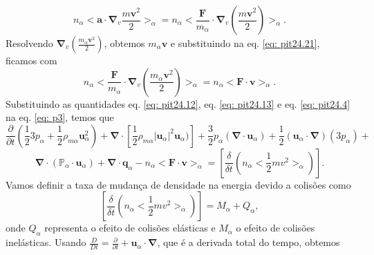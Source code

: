 \documentclass[12pt,oneside,a4paper]{abntex2}
\begin{document}
\begin{equation}
\label{eq: pit24.21}
n_\alpha <\bm{a} \cdot \bm{\nabla}_v \frac{m \bm{v}^2}{2}>_\alpha = n_\alpha<\frac{\bm{F}}{m_\alpha} \cdot \bm{\nabla}_v \left( \frac{m \bm{v}^2}{2}\right)>_\alpha .
\end{equation}
Resolvendo $\bm{\nabla}_v ( \frac{m_\alpha \bm{v}^2}{2})$, obtemos $m_\alpha \bm{v}$ e substituindo na eq. \ref{eq: pit24.21}, ficamos com
\begin{equation}
\label{eq: pit24.4}
n_\alpha<\frac{\bm{F}}{m_\alpha} \cdot \bm{\nabla}_v \left( \frac{m_\alpha \bm{v}^2}{2}\right)>_\alpha = n_\alpha <\bm{F} \cdot \bm{v}>_\alpha .
\end{equation}
Substituindo as quantidades eq. \ref{eq: pit24.12}, eq. \ref{eq: pit24.13} e eq. \ref{eq: pit24.4} na eq. \ref{eq: p3}, temos que 
\begin{equation}
\label{eq: p4}
\frac{\partial }{\partial t}  \left( \frac{1}{2} 3p_\alpha+\frac{1}{2} \rho_{m\alpha}\bm{u}^2_\alpha \right) +\bm{\nabla} \cdot \left[ \frac{1}{2}\rho_{m\alpha}|\bm{u}_\alpha|^2 \bm{u}_\alpha) \right]+ \frac{3}{2}p_\alpha (\bm{\nabla} \cdot \bm{u}_\alpha) +  \frac{1}{2}(\bm{u}_\alpha \cdot \bm{\nabla})(3p_\alpha)+ 
\end{equation}
\begin{equation*}
\bm{\nabla} \cdot (\mathbb{P}_\alpha \cdot \bm{u}_\alpha) + \bm{\nabla} \cdot \bm{q}_\alpha-n_\alpha <\bm{F} \cdot \bm{v}>_\alpha =\left[\frac{\delta}{\delta t}(n_\alpha<\frac{1}{2}m v^2>_\alpha)\right] .
\end{equation*}
Vamos definir a taxa de mudança de densidade na energia devido a colisões como
\begin{equation}
\left[\frac{\delta}{\delta t}(n_\alpha<\frac{1}{2}m v^2>_\alpha)\right] = M_\alpha + Q_\alpha,
\end{equation}
onde $Q_\alpha$ representa o efeito de colisões elásticas e $M_\alpha$ o efeito de colisões inelásticas. 
Usando $\frac{D}{Dt} = \frac{\partial }{\partial t} + \bm{u}_\alpha \cdot \bm{\nabla}$, que é a derivada total do tempo, obtemos
\end{document}
